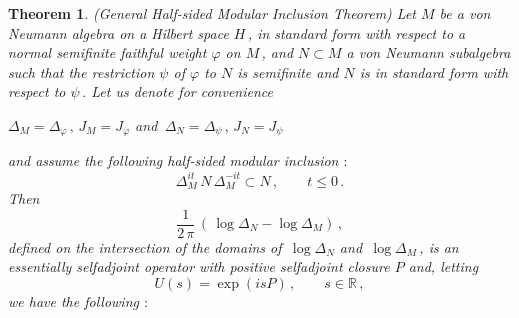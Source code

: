 \documentclass[reqno]{amsart}
\newtheorem{theorem}{Theorem}[section]
\theoremstyle{definition}
\theoremstyle{remark}
\numberwithin{equation}{section}
\theoremstyle{plain}
\begin{document}
\begin{theorem}\label{hsmi}
{\rm (General Half-sided Modular Inclusion Theorem)}
Let $M$ be a von Neumann algebra on a Hilbert space $H\,$, in
standard form with respect to a normal semifinite faithful weight
$\varphi$ on $M\,$, and $N\subset M$ a von Neumann subalgebra such
that the restriction $\psi$ of $\varphi$ to $N$ is semifinite and
$N$ is in standard form with respect to $\psi\,$. Let us denote for
convenience
\begin{center}
$\Delta_M =\Delta_\varphi\, ,\, J_M=J_\varphi$ and
$\,\Delta_N =\Delta_\psi\, ,\, J_N=J_\psi$ 
\end{center}
and assume the following half-sided modular inclusion $:$
\begin{equation}\label{hsmicond}
\Delta_M^{it}\, N\,\Delta_M^{-it}\subset N\, ,\qquad t\leq 0\, .
\end{equation}
Then
\begin{equation}\label{generator}
\frac 1{2\,\pi}\, (\,\log \Delta_N -\log \Delta_M )\, ,
\end{equation}
defined on the intersection of the domains of $\,\log \Delta_N$ and
$\,\log \Delta_M\,$, is an essentially selfadjoint operator with
positive selfadjoint closure $P$ and, letting
\begin{equation}\label{generation}
U(s) =\exp (i s P)\, ,\qquad s\in \mathbb R\, ,
\end{equation}
we have the following $:$
\end{theorem}
\end{document}
